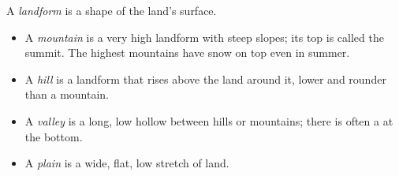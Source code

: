 \begin{definition}[Landforms]\label{def:g1:landscapes-around-us:landform}
A \emph{landform} is a shape of the land's surface.
\begin{itemize}
  \item A \emph{mountain} is a very high landform with steep
        slopes; its top is called the summit. The highest mountains have
        snow on top even in summer.
  \item A \emph{hill} is a landform that rises above the land
        around it, lower and rounder than a mountain.
  \item A \emph{valley} is a long, low hollow between hills or
        mountains; there is often a  at the bottom.
  \item A \emph{plain} is a wide, flat, low stretch of land.
\end{itemize}
\end{definition}

